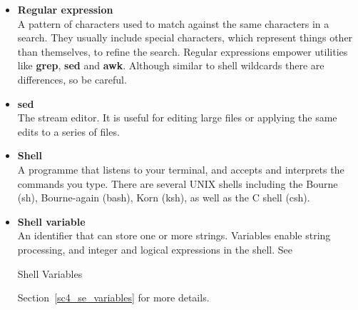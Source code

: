 \documentclass[twoside,11pt]{article}
\newcommand{\htmlref}[2]{#1}
\newcommand{\latex}[1]{#1}
\begin{document}
\begin{itemize}
\item {\bf\label{sc4_gl_reg_exp}Regular expression}\\
      A pattern of characters used to match against the same
      characters in a search.  They usually include \htmlref{special
      characters}{sc4_gl_met}, which represent things other than
      themselves, to refine the search.  Regular expressions empower
      utilities like {\bf grep}, {\bf sed} and {\bf awk}.  Although
      similar to shell \htmlref{wildcards}{sc4_gl_wild} there are
      differences, so be careful.


\item {\bf\label{sc4_gl_sed}sed}\\
      The stream editor.  It is useful for editing large files or
      applying the same edits to a series of files.

\item {\bf\label{sc4_gl_she}Shell}\\
      A programme that listens to your terminal, and accepts and
      interprets the commands you type.  There are several UNIX
      shells including the Bourne (sh), Bourne-again (bash),
      Korn (ksh), as well as the C shell (csh).

\item {\bf\label{sc4_gl_she_var}Shell variable}\\
      An identifier that can store one or more strings.  Variables
      enable string processing, and integer and logical expressions
      in the \htmlref{shell}{sc4_gl_she}.  See
\begin{htmlonly}
      \htmlref{Shell Variables}{sc4_se_variables}
\end{htmlonly}
      \latex{Section~\ref{sc4_se_variables}} for more details.


\end{itemize}
\end{document}
